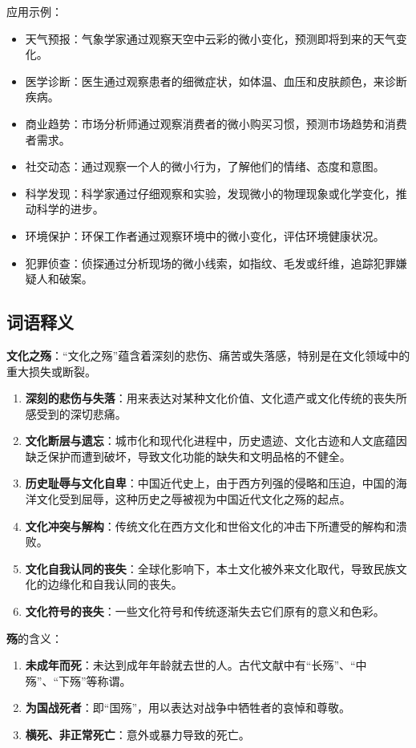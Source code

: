 应用示例：
\begin{itemize}[leftmargin=*]
    \item 天气预报：气象学家通过观察天空中云彩的微小变化，预测即将到来的天气变化。
    \item 医学诊断：医生通过观察患者的细微症状，如体温、血压和皮肤颜色，来诊断疾病。
    \item 商业趋势：市场分析师通过观察消费者的微小购买习惯，预测市场趋势和消费者需求。
    \item 社交动态：通过观察一个人的微小行为，了解他们的情绪、态度和意图。
    \item 科学发现：科学家通过仔细观察和实验，发现微小的物理现象或化学变化，推动科学的进步。
    \item 环境保护：环保工作者通过观察环境中的微小变化，评估环境健康状况。
    \item 犯罪侦查：侦探通过分析现场的微小线索，如指纹、毛发或纤维，追踪犯罪嫌疑人和破案。
\end{itemize}

\subsection*{词语释义}

\textbf{文化之殇}：“文化之殇”蕴含着深刻的悲伤、痛苦或失落感，特别是在文化领域中的重大损失或断裂。

\begin{enumerate}[leftmargin=*]
    \item \textbf{深刻的悲伤与失落}：用来表达对某种文化价值、文化遗产或文化传统的丧失所感受到的深切悲痛。
    \item \textbf{文化断层与遗忘}：城市化和现代化进程中，历史遗迹、文化古迹和人文底蕴因缺乏保护而遭到破坏，导致文化功能的缺失和文明品格的不健全。
    \item \textbf{历史耻辱与文化自卑}：中国近代史上，由于西方列强的侵略和压迫，中国的海洋文化受到屈辱，这种历史之辱被视为中国近代文化之殇的起点。
    \item \textbf{文化冲突与解构}：传统文化在西方文化和世俗文化的冲击下所遭受的解构和溃败。
    \item \textbf{文化自我认同的丧失}：全球化影响下，本土文化被外来文化取代，导致民族文化的边缘化和自我认同的丧失。
    \item \textbf{文化符号的丧失}：一些文化符号和传统逐渐失去它们原有的意义和色彩。
\end{enumerate}

\textbf{殇}的含义：
\begin{enumerate}[leftmargin=*]
    \item \textbf{未成年而死}：未达到成年年龄就去世的人。古代文献中有“长殇”、“中殇”、“下殇”等称谓。
    \item \textbf{为国战死者}：即“国殇”，用以表达对战争中牺牲者的哀悼和尊敬。
    \item \textbf{横死、非正常死亡}：意外或暴力导致的死亡。
\end{enumerate}

